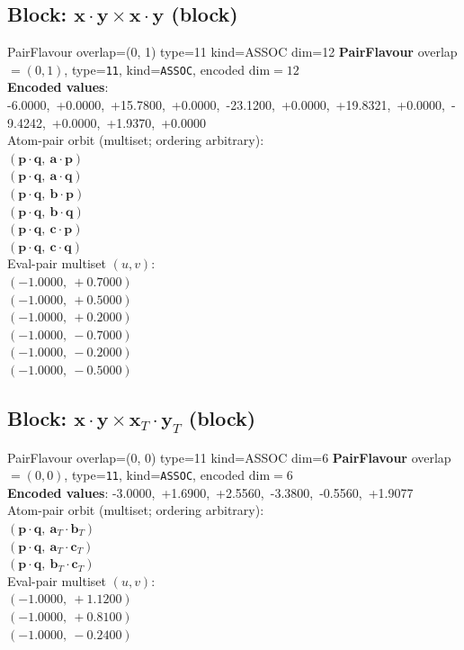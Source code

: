\documentclass[a4paper,11pt]{article}
\newcommand{\pdcegfomjfhook}[2]{\mathbf{#1} \cdot \mathbf{#2}}
\newcommand{\fpbeomcfokjooi}[2]{\mathbf{#1}_T \cdot \mathbf{#2}_T}
\begin{document}
\subsection{Block: $\pdcegfomjfhook{x}{y} \times \pdcegfomjfhook{x}{y}$  (block)}
    PairFlavour  overlap=(0, 1)  type=11  kind=ASSOC  dim=12
\textbf{PairFlavour} overlap$=(0, 1)$, type=\texttt{11}, kind=\texttt{ASSOC}, encoded dim$=12$\\
\textbf{      Encoded values}: -6.0000,\ +0.0000,\ +15.7800,\ +0.0000,\ -23.1200,\ +0.0000,\ +19.8321,\ +0.0000,\ -9.4242,\ +0.0000,\ +1.9370,\ +0.0000\\
\quad Atom-pair orbit (multiset; ordering arbitrary):\\
$(\pdcegfomjfhook{p}{q},\ \pdcegfomjfhook{a}{p})$\\
$(\pdcegfomjfhook{p}{q},\ \pdcegfomjfhook{a}{q})$\\
$(\pdcegfomjfhook{p}{q},\ \pdcegfomjfhook{b}{p})$\\
$(\pdcegfomjfhook{p}{q},\ \pdcegfomjfhook{b}{q})$\\
$(\pdcegfomjfhook{p}{q},\ \pdcegfomjfhook{c}{p})$\\
$(\pdcegfomjfhook{p}{q},\ \pdcegfomjfhook{c}{q})$\\
\quad Eval-pair multiset $(u, v)$:\\
$(-1.0000,\ +0.7000)$\\
$(-1.0000,\ +0.5000)$\\
$(-1.0000,\ +0.2000)$\\
$(-1.0000,\ -0.7000)$\\
$(-1.0000,\ -0.2000)$\\
$(-1.0000,\ -0.5000)$\\

\subsection{Block: $\pdcegfomjfhook{x}{y} \times \fpbeomcfokjooi{x}{y}$  (block)}
    PairFlavour  overlap=(0, 0)  type=11  kind=ASSOC  dim=6
\textbf{PairFlavour} overlap$=(0, 0)$, type=\texttt{11}, kind=\texttt{ASSOC}, encoded dim$=6$\\
\textbf{      Encoded values}: -3.0000,\ +1.6900,\ +2.5560,\ -3.3800,\ -0.5560,\ +1.9077\\
\quad Atom-pair orbit (multiset; ordering arbitrary):\\
$(\pdcegfomjfhook{p}{q},\ \fpbeomcfokjooi{a}{b})$\\
$(\pdcegfomjfhook{p}{q},\ \fpbeomcfokjooi{a}{c})$\\
$(\pdcegfomjfhook{p}{q},\ \fpbeomcfokjooi{b}{c})$\\
\quad Eval-pair multiset $(u, v)$:\\
$(-1.0000,\ +1.1200)$\\
$(-1.0000,\ +0.8100)$\\
$(-1.0000,\ -0.2400)$\\
\end{document}
